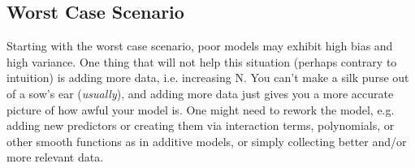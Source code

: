 \documentclass[english,nohyper,titlepage]{tufte-handout}\usepackage{knitr}
\begin{document}
\subsection{Worst Case Scenario}
Starting with the worst case scenario, poor models may exhibit high bias and high variance.  One thing that will not help this situation (perhaps contrary to intuition) is adding more data, i.e. increasing N.  You can't make a silk purse out of a sow's ear (\emph{usually}), and adding more data just gives you a more accurate picture of how awful your model is. One might need to rework the model, e.g. adding new predictors or creating them via interaction terms, polynomials, or other smooth functions as in additive models, or simply collecting better and/or more relevant data.
\end{document}

